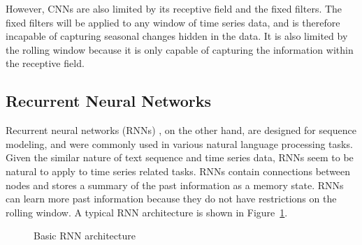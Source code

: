 \documentclass{article} %
\begin{document}
However, CNNs are also limited by its receptive field and the fixed filters.
The fixed filters will be applied to any window of time series data, and is therefore incapable of capturing seasonal changes hidden in the data.
It is also limited by the rolling window because it is only capable of capturing the information within the receptive field.

\subsection{Recurrent Neural Networks}

Recurrent neural networks (RNNs) \citet{10.5555/65669.104451}, on the other hand, are designed for sequence modeling, and were commonly used in various natural language processing tasks.
Given the similar nature of text sequence and time series data, RNNs seem to be natural to apply to time series related tasks.
RNNs contain connections between nodes and stores a summary of the past information as a memory state.
RNNs can learn more past information because they do not have restrictions on the rolling window.
A typical RNN architecture is shown in Figure~\ref{fig:rnn}.

\begin{figure}[ht]
\centering
{}

\caption{Basic RNN architecture}\label{fig:rnn}
\end{figure}
\end{document}
